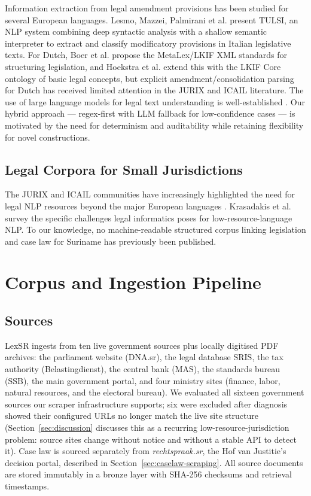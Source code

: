 \documentclass{IOS-Book-Article}
\begin{document}
Information extraction from legal amendment provisions has been studied for several European
languages. Lesmo, Mazzei, Palmirani et al. \cite{tulsi2013} present TULSI, an NLP system
combining deep syntactic analysis with a shallow semantic interpreter to extract and classify
modificatory provisions in Italian legislative texts. For Dutch, Boer et al. \cite{boer2007}
propose the MetaLex/LKIF XML standards for structuring legislation, and Hoekstra et al.
\cite{hoekstra2007} extend this with the LKIF Core ontology of basic legal concepts, but
explicit amendment/consolidation parsing for Dutch has received limited attention in the
JURIX and ICAIL literature. The use of large language models for
legal text understanding is well-established \cite{chalkidis2020,koreeda2021}. Our hybrid approach --- regex-first with LLM fallback for low-confidence cases --- is
motivated by the need for determinism and auditability while retaining flexibility for novel
constructions.

\subsection{Legal Corpora for Small Jurisdictions}

The JURIX and ICAIL communities have increasingly highlighted the need for legal NLP
resources beyond the major European languages \cite{niklaus2024}. Krasadakis et al.
\cite{krasadakis2024} survey the specific challenges legal informatics poses for
low-resource-language NLP. To our knowledge, no
machine-readable structured corpus linking legislation and case law for Suriname has
previously been published.

\section{Corpus and Ingestion Pipeline}
\label{sec:corpus}

\subsection{Sources}

LexSR ingests from ten live government sources plus locally digitised PDF archives: the
parliament website (DNA.sr), the legal database SRIS, the tax authority (Belastingdienst),
the central bank (MAS), the standards bureau (SSB), the main government portal, and four
ministry sites (finance, labor, natural resources, and the electoral bureau). We evaluated
all sixteen government sources our scraper infrastructure supports; six were excluded after
diagnosis showed their configured URLs no longer match the live site structure
(Section~\ref{sec:discussion} discusses this as a recurring low-resource-jurisdiction problem: source
sites change without notice and without a stable API to detect it). Case law is sourced separately from
\emph{rechtspraak.sr}, the Hof van Justitie's decision portal, described in Section~\ref{sec:caselaw-scraping}. All
source documents are stored immutably in a bronze layer with SHA-256 checksums and retrieval
timestamps.
\end{document}
